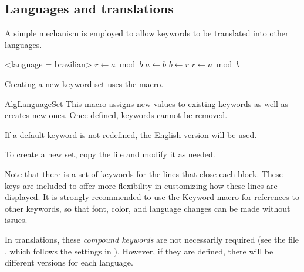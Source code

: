 \documentclass[a4paper, 11pt]{article}
\begin{document}
\begin{comment}
    parameter indent = 0pt,
\end{comment}

\subsection{Languages and translations}\label{sec:languages-and-translations}
%
A simple mechanism is employed to allow keywords to be translated into other languages.

\begingroup
\begin{PDExample}
    \begin{algorithmic}<language = brazilian>
            \State $r\gets a\bmod b$
                \State $a\gets b$
                \State $b\gets r$
                \State $r\gets a\bmod b$
            \EndWhile
        \EndProcedure
    \end{algorithmic}
\end{PDExample}
\endgroup


Creating a new keyword set uses the  macro.

\begin{Macrodef}{AlgLanguageSet}{}{}
    This macro assigns new values to existing keywords as well as creates new ones. Once defined, keywords cannot be removed.


    If a default keyword is not redefined, the English version will be used.


    To create a new set, copy the file  and modify it as needed.


    Note that there is a set of keywords for the lines that close each block. These keys are included to offer more flexibility in customizing how these lines are displayed. It is strongly recommended to use the {Keyword} macro for references to other keywords, so that font, color, and language changes can be made without issues.


    In translations, these \textit{compound keywords} are not necessarily required (see the file , which follows the settings in ). However, if they are defined, there will be different versions for each language.
\end{Macrodef}
\end{document}
